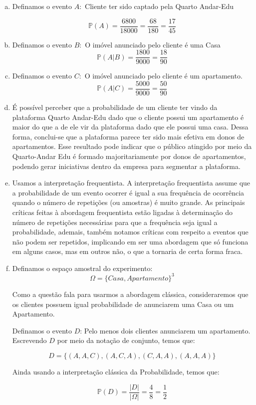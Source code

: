 \documentclass[12pt]{article}
\begin{document}
\begin{enumerate}[a)]
    \item 
    Definamos o evento $A:$ Cliente ter sido captado pela Quarto Andar-Edu 

    $$\mathds{P}(A) = \dfrac{6800}{18000} = \dfrac{68}{180}=\dfrac{17}{45}$$
    \item 
    Definamos o evento $B:$ O imóvel anunciado pelo cliente é uma Casa
    $$\mathds{P}(A|B) = \dfrac{1800}{9000} = \dfrac{18}{90}$$
    \item 
    Definamos o evento $C:$ O imóvel anunciado pelo cliente é um apartamento. 
    $$\mathds{P}(A|C) = \dfrac{5000}{9000} = \dfrac{50}{90}$$
    \item 
    É possível perceber que a probabilidade de um cliente ter vindo da plataforma Quarto Andar-Edu dado que o cliente possui um apartamento é maior do que 
    a de ele vir da plataforma dado que ele possui uma casa. Dessa forma, conclui-se que a plataforma parece ter sido mais efetiva em donos
    de apartamentos. Esse resultado pode indicar que o público atingido por meio da Quarto-Andar Edu é formado majoritariamente por donos de apartamentos,
    podendo gerar iniciativas dentro da empresa para segmentar a plataforma.  
    \item 
    Usamos a interpretação frequentista. A interpretação frequentista assume que a probabilidade de um evento ocorrer é igual
    a sua frequência de ocorrência quando o número de repetições (ou amostras) é muito grande. As principais críticas feitas à abordagem frequentista estão ligadas 
    à determinação do número de repetições necessárias para que a frequência seja igual a probabilidade, ademais, também notamos críticas
    com respeito a eventos que não podem ser repetidos, implicando em ser uma abordagem que só funciona em alguns casos, mas em outros não, o que 
    a tornaria de certa forma fraca. 
    \item Definamos o espaço amostral do experimento:
    $$\Omega = \{Casa, Apartamento\}^3$$
    
    Como a questão fala para usarmos a abordagem clássica, consideraremos que os clientes possuem igual probabilidade de anunciarem uma Casa
    ou um Apartamento. 

    Definamos o evento $D$: Pelo menos dois clientes anunciarem um apartamento. Escrevendo $D$ por meio da notação de conjunto, temos que:

    $$D=\{(A, A, C), (A, C, A), (C, A, A), (A, A, A)\}$$

    Ainda usando a interpretação clássica da Probabilidade, temos que:

    $$\mathds{P}(D) = \dfrac{|D|}{|\Omega|} = \dfrac{4}{8} = \dfrac{1}{2}$$
\end{enumerate}
\end{document}
